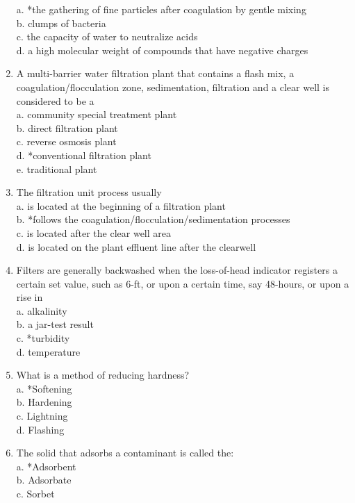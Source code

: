 \begin{enumerate}
a. *the gathering of fine particles after coagulation by gentle mixing\\
b. clumps of bacteria\\
c. the capacity of water to neutralize acids\\
d. a high molecular weight of compounds that have negative charges\\
\item A multi-barrier water filtration plant that contains a flash mix, a coagulation/flocculation zone, sedimentation, filtration and a clear well is considered to be a\\
a. community special treatment plant\\
b. direct filtration plant\\
c. reverse osmosis plant\\
d. *conventional filtration plant\\
e. traditional plant\\
\item The filtration unit process usually\\
a. is located at the beginning of a filtration plant\\
b. *follows the coagulation/flocculation/sedimentation processes\\
c. is located after the clear well area\\
d. is located on the plant effluent line after the clearwell\\
\item Filters are generally backwashed when the loss-of-head indicator registers a certain set value, such as 6-ft, or upon a certain time, say 48-hours, or upon a rise in\\
a. alkalinity\\
b. a jar-test result\\
c. *turbidity\\
d. temperature\\
\item What is a method of reducing hardness?\\
a. *Softening\\
b. Hardening\\
c. Lightning\\
d. Flashing\\
\item The solid that adsorbs a contaminant is called the:\\
a. *Adsorbent\\
b. Adsorbate\\
c. Sorbet\\

\end{enumerate}
